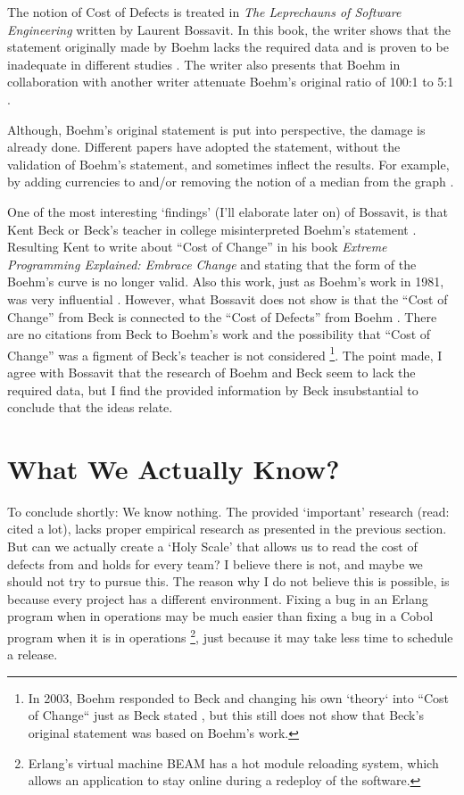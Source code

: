 The notion of Cost of Defects is treated in \textit{The Leprechauns of Software Engineering} \autocite{bossavit2013leprechauns} written by Laurent Bossavit.
In this book, the writer shows that the statement originally made by Boehm lacks the required data and is proven to be inadequate in different studies \autocite[98,102]{bossavit2013leprechauns}.
The writer also presents that Boehm in collaboration with another writer attenuate Boehm's original ratio of 100:1 to 5:1 \autocite[426]{boehm2005software}.

Although, Boehm's original statement is put into perspective, the damage is already done.
Different papers have adopted the statement, without the validation of Boehm's statement, and sometimes inflect the results.
For example, by adding currencies to and/or removing the notion of a median from the graph \autocite{bossavit2013leprechauns}.

One of the most interesting `findings' (I'll elaborate later on) of Bossavit, is that Kent Beck or Beck's teacher in college misinterpreted Boehm's statement \autocite[97]{bossavit2013leprechauns} \autocite[21]{beck2000extreme}.
Resulting Kent to write about ``Cost of Change'' in his book \textit{Extreme Programming Explained: Embrace Change} \autocite{beck2000extreme} and stating that the form of the Boehm's curve is no longer valid.
Also this work, just as Boehm's work in 1981, was very influential \autocite{beck2000extreme} \autocite{boehm1981software}.
However, what Bossavit does not show is that the ``Cost of Change'' from Beck is connected to the ``Cost of Defects'' from Boehm \autocite{bossavit2013leprechauns}.
There are no citations from Beck to Boehm's work and the possibility that ``Cost of Change'' was a figment of Beck's teacher is not considered \footnote{In 2003, Boehm responded to Beck and changing his own `theory` into ``Cost of Change`` just as Beck stated \autocite{boehm2003balancing}, but this still does not show that Beck's original statement was based on Boehm's work.}.
The point made, I agree with Bossavit that the research of Boehm and Beck seem to lack the required data,
but I find the provided information by Beck insubstantial to conclude that the ideas relate.

\section*{What We Actually Know?}

To conclude shortly: We know nothing.
The provided `important' research (read: cited a lot), lacks proper empirical research as presented in the previous section.
But can we actually create a `Holy Scale' that allows us to read the cost of defects from and holds for every team?
I believe there is not, and maybe we should not try to pursue this.
The reason why I do not believe this is possible, is because every project has a different environment.
Fixing a bug in an Erlang program when in operations may be much easier than fixing a bug in a Cobol program when it is in operations
\footnote{Erlang's virtual machine BEAM has a hot module reloading system, which allows an application to stay online during a redeploy of the software.},
just because it may take less time to schedule a release.

